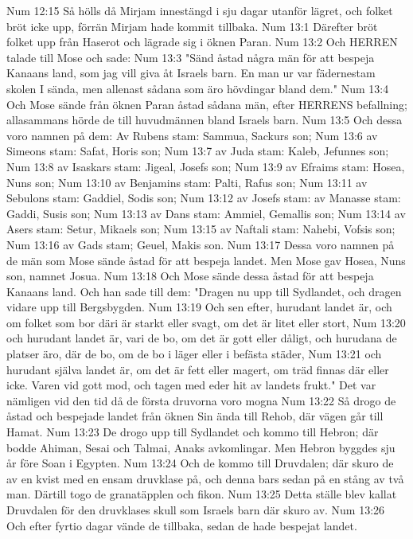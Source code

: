 Num 12:15  Så hölls då Mirjam innestängd i sju dagar utanför lägret, och folket bröt icke upp, förrän Mirjam hade kommit tillbaka.
Num 13:1  Därefter bröt folket upp från Haserot och lägrade sig i öknen Paran.
Num 13:2  Och HERREN talade till Mose och sade:
Num 13:3  "Sänd åstad några män för att bespeja Kanaans land, som jag vill giva åt Israels barn. En man ur var fädernestam skolen I sända, men allenast sådana som äro hövdingar bland dem."
Num 13:4  Och Mose sände från öknen Paran åstad sådana män, efter HERRENS befallning; allasammans hörde de till huvudmännen bland Israels barn.
Num 13:5  Och dessa voro namnen på dem: Av Rubens stam: Sammua, Sackurs son;
Num 13:6  av Simeons stam: Safat, Horis son;
Num 13:7  av Juda stam: Kaleb, Jefunnes son;
Num 13:8  av Isaskars stam: Jigeal, Josefs son;
Num 13:9  av Efraims stam: Hosea, Nuns son;
Num 13:10  av Benjamins stam: Palti, Rafus son;
Num 13:11  av Sebulons stam: Gaddiel, Sodis son;
Num 13:12  av Josefs stam: av Manasse stam: Gaddi, Susis son;
Num 13:13  av Dans stam: Ammiel, Gemallis son;
Num 13:14  av Asers stam: Setur, Mikaels son;
Num 13:15  av Naftali stam: Nahebi, Vofsis son;
Num 13:16  av Gads stam; Geuel, Makis son.
Num 13:17  Dessa voro namnen på de män som Mose sände åstad för att bespeja landet. Men Mose gav Hosea, Nuns son, namnet Josua.
Num 13:18  Och Mose sände dessa åstad för att bespeja Kanaans land. Och han sade till dem: "Dragen nu upp till Sydlandet, och dragen vidare upp till Bergsbygden.
Num 13:19  Och sen efter, hurudant landet är, och om folket som bor däri är starkt eller svagt, om det är litet eller stort,
Num 13:20  och hurudant landet är, vari de bo, om det är gott eller dåligt, och hurudana de platser äro, där de bo, om de bo i läger eller i befästa städer,
Num 13:21  och hurudant själva landet är, om det är fett eller magert, om träd finnas där eller icke. Varen vid gott mod, och tagen med eder hit av landets frukt." Det var nämligen vid den tid då de första druvorna voro mogna
Num 13:22  Så drogo de åstad och bespejade landet från öknen Sin ända till Rehob, där vägen går till Hamat.
Num 13:23  De drogo upp till Sydlandet och kommo till Hebron; där bodde Ahiman, Sesai och Talmai, Anaks avkomlingar. Men Hebron byggdes sju år före Soan i Egypten.
Num 13:24  Och de kommo till Druvdalen; där skuro de av en kvist med en ensam druvklase på, och denna bars sedan på en stång av två man. Därtill togo de granatäpplen och fikon.
Num 13:25  Detta ställe blev kallat Druvdalen för den druvklases skull som Israels barn där skuro av.
Num 13:26  Och efter fyrtio dagar vände de tillbaka, sedan de hade bespejat landet.
